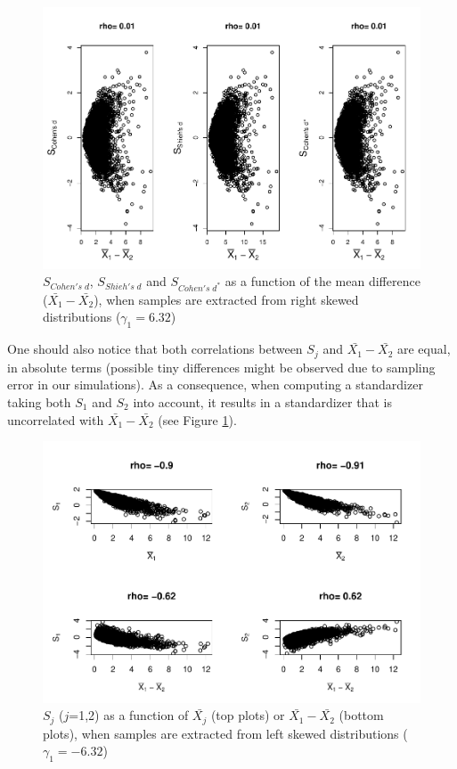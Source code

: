 \documentclass[
  english,
  man,mask,floatsintext]{apa6}
\begin{document}
\begin{figure}
\centering
\includegraphics{Correlation_files/figure-latex/pltStdzrHombalRskew-1.pdf}
\caption{\label{fig:pltStdzrHombalRskew}\(S_{Cohen's \; d}\), \(S_{Shieh's \; d}\) and \(S_{Cohen's \; d^*}\) as a function of the mean difference (\(\bar{X_1}-\bar{X_2}\)), when samples are extracted from right skewed distributions (\(\gamma_1 = 6.32\))}
\end{figure}

One should also notice that both correlations between \(S_j\) and \(\bar{X_1}-\bar{X_2}\) are equal, in absolute terms (possible tiny differences might be observed due to sampling error in our simulations). As a consequence, when computing a standardizer taking both \(S_1\) and \(S_2\) into account, it results in a standardizer that is uncorrelated with \(\bar{X_1}-\bar{X_2}\) (see Figure \ref{fig:pltStdzrHombalRskew}).

\begin{figure}
\centering
\includegraphics{Correlation_files/figure-latex/pltSDHombalLskew-1.pdf}
\caption{\label{fig:pltSDHombalLskew}\(S_j\) (\(j\)=1,2) as a function of \(\bar{X_j}\) (top plots) or \(\bar{X_1}-\bar{X_2}\) (bottom plots), when samples are extracted from left skewed distributions (\(\gamma_1 = -6.32\))}
\end{figure}
\end{document}
